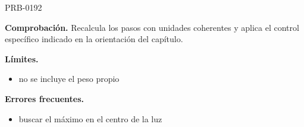 \begin{studiumworked}{PRB-0192}
\par\textbf{Comprobación.} Recalcula los pasos con unidades coherentes y aplica el control específico indicado en la orientación del capítulo.

\textbf{Límites.}\begin{itemize}\item no se incluye el peso propio\end{itemize}

\textbf{Errores frecuentes.}\begin{itemize}\item buscar el máximo en el centro de la luz\end{itemize}

\end{studiumworked}

\Needspace{.3\textheight}


